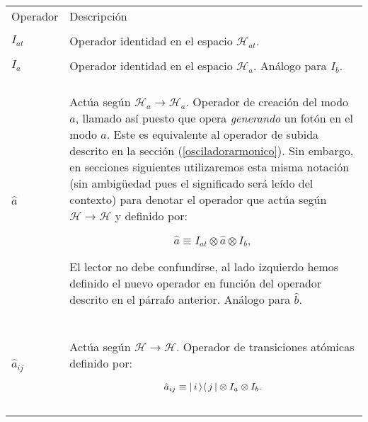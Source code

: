 \begin{tabular*}{\textwidth}{ll}
\hline\multirow{2}{*}{\large{Operador}}&\multirow{2}{*}{\large{Descripci\'on}}\\ &\\ \hline\\\vspace*{0.5cm}

$I_{at}$ & Operador identidad en el espacio $\mathcal{H}_{at}$.\vspace*{0.5cm} \\\hline\\\vspace*{0.5cm}

$I_a$  & Operador identidad en el espacio $\mathcal{H}_{a}$. An\'alogo para $I_{b}$.\vspace*{0.5cm}\\\hline\\\vspace*{0.5cm}

$\hat{a}$& \begin{minipage}{14cm}
      Act\'ua seg\'un $\mathcal{H}_a\rightarrow \mathcal{H}_a$. Operador de creaci\'on del modo $a$, llamado as\'i puesto que opera \emph{generando} un fot\'on en el modo $a$. Este es equivalente al operador de subida descrito en la secci\'on (\ref{osciladorarmonico}). Sin embargo, en secciones siguientes utilizaremos esta misma notaci\'on (sin ambig\"uedad pues el significado ser\'a le\'ido del contexto) para denotar el operador que act\'ua seg\'un $\mathcal{H}\rightarrow\mathcal{H}$ y definido por:

\begin{equation}
 \hat{a}\equiv I_{at}\otimes \hat{a} \otimes I_b,\label{ec:operador_creacion_a}
\end{equation}

El lector no debe confundirse, al lado izquierdo hemos definido el nuevo operador en funci\'on del operador descrito en el p\'arrafo anterior. An\'alogo para $\hat{b}$.
     \end{minipage}\vspace*{0.5cm}\\\hline\\\vspace*{0.5cm}

$\hat{a}_{ij}$ & \begin{minipage}{14cm} Act\'ua seg\'un $\mathcal{H}\rightarrow\mathcal{H}$. Operador de transiciones at\'omicas definido por: 

\begin{equation}\hat{a}_{ij}\equiv \vert\, i \,\rangle\langle\, j \,\vert\otimes I_a \otimes I_b.\label{ec:operador_transicion_H}
\end{equation} \end{minipage}\vspace*{0.5cm}\\\hline\\\vspace*{0.5cm}
\end{tabular*} 

